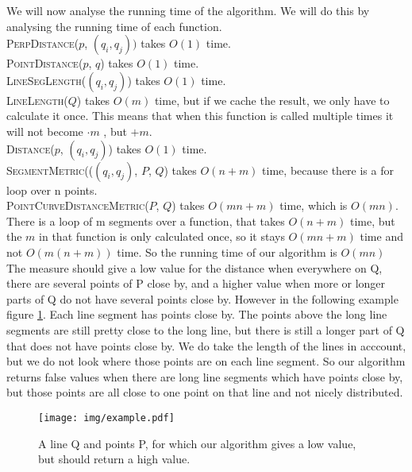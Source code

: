 \documentclass[a4paper,11pt]{article}
\begin{document}
 
	
	
We will now analyse the running time of the algorithm. 
We will do this by analysing the running time of each function.\\
\textsc{PerpDistance}($p$, $(q_i, q_j))$ takes $O(1)$ time.\\
\textsc{PointDistance}($p$, $q$) takes $O(1)$ time. \\
\textsc{LineSegLength}($(q_i, q_j)$) takes $O(1)$ time. \\
\textsc{LineLength}($Q$) takes $O(m)$ time, but if we cache the result, we only have to calculate it once. This means that when this function is called multiple times it will not become $\cdot m$ , but $+m$.\\
\textsc{Distance}($p$, $(q_i, q_j)$) takes $O(1)$ time.\\
\textsc{SegmentMetric}(($(q_i, q_j)$, $P$, $Q$) takes $O(n+m)$ time, because there is a for loop over n points. \\
\textsc{PointCurveDistanceMetric}($P$, $Q$)  takes $O(mn + m)$ time, which is $O(mn)$. 
There is a loop of m segments over a function, that takes $O(n+m)$ time, but the $m$ in that function is only calculated once, so it stays $O(mn+m)$ time and not $O(m(n+m))$ time.
So the running time of our algorithm is  $O(mn)$ \\

The measure should give a low value for the distance when everywhere on Q, there are several points of P close by, and a higher value when more or longer parts of Q do not have several points close by.
However in the following example figure \ref{fig:example}. Each line segment has points close by. 
The points above the long line segments are still pretty close to the long line, but there is still a longer part of Q that does not have points close by. 
We do take the length of the lines in acccount, but we do not look where those points are on each line segment. 
So our algorithm returns false values when there are long line segments which have points close by, but those points are all close to one point on that line and not nicely distributed. 
\begin{figure}[H]
	\centering
	\label{fig:example}
	\texttt{[image: img/example.pdf]}
	\caption{A line Q and points P, for which our algorithm gives a low value, but should return a high value.}
\end{figure}
\end{document}
